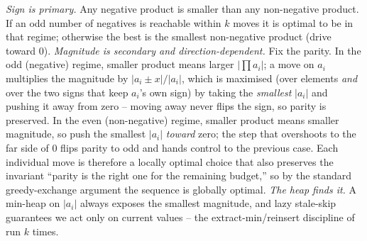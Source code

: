 \begin{proofbox}
\emph{Sign is primary.} Any negative product is smaller than any non-negative product. If an odd number of
negatives is reachable within $k$ moves it is optimal to be in that regime; otherwise the best is the
smallest non-negative product (drive toward $0$). \emph{Magnitude is secondary and direction-dependent.}
Fix the parity. In the odd (negative) regime, smaller product means larger $|{\prod a_i}|$; a move on $a_i$
multiplies the magnitude by $|a_i\pm x|/|a_i|$, which is maximised (over elements \emph{and} over the two
signs that keep $a_i$'s own sign) by taking the \emph{smallest} $|a_i|$ and pushing it away from zero --
moving away never flips the sign, so parity is preserved. In the even (non-negative) regime, smaller product
means smaller magnitude, so push the smallest $|a_i|$ \emph{toward} zero; the step that overshoots to the far
side of $0$ flips parity to odd and hands control to the previous case. Each individual move is therefore a
locally optimal choice that also preserves the invariant ``parity is the right one for the remaining budget,''
so by the standard greedy-exchange argument the sequence is globally optimal. \emph{The heap finds it.} A
min-heap on $|a_i|$ always exposes the smallest magnitude, and lazy stale-skip guarantees we act only on
current values -- the extract-min/reinsert discipline of  run $k$ times.
\end{proofbox}

